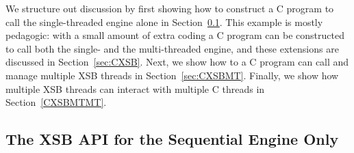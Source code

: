 We structure out discussion by first showing how to construct a C
program to call the single-threaded engine alone in
Section~\ref{sec:CXSBSeq}.  This example is mostly pedagogic: with a
small amount of extra coding a C program can be constructed to call
both the single- and the multi-threaded engine, and these extensions
are discussed in Section~\ref{sec:CXSB}.  Next, we show how to a C
program can call and manage multiple XSB threads in Section~\ref{sec:CXSBMT}.
Finally, we show how multiple XSB threads can interact with multiple C
threads in Section~\ref{CXSBMTMT}.

\subsection{The XSB API for the Sequential Engine Only} \label{sec:CXSBSeq}

